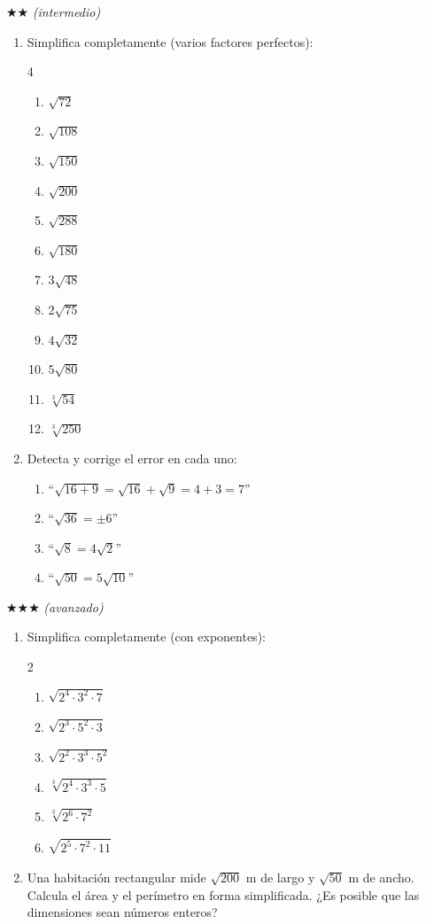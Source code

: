 \documentclass[11pt, letterpaper]{article}
\begin{document}
$\bigstar\bigstar$ \textit{(intermedio)}

\begin{enumerate}[label=\textbf{\arabic*.}, leftmargin=*, resume]
  \item Simplifica completamente (varios factores perfectos):
  \begin{multicols}{4}
  \begin{enumerate}[label=\alph*)]
    \item $\sqrt{72}$
    \item $\sqrt{108}$
    \item $\sqrt{150}$
    \item $\sqrt{200}$
    \item $\sqrt{288}$
    \item $\sqrt{180}$
    \item $3\sqrt{48}$
    \item $2\sqrt{75}$
    \item $4\sqrt{32}$
    \item $5\sqrt{80}$
    \item $\sqrt[3]{54}$
    \item $\sqrt[3]{250}$
  \end{enumerate}
  \end{multicols}

  \item Detecta y corrige el error en cada uno:
  \begin{enumerate}[label=\alph*)]
    \item ``$\sqrt{16+9}=\sqrt{16}+\sqrt{9}=4+3=7$''
    \item ``$\sqrt{36}=\pm 6$''
    \item ``$\sqrt{8}=4\sqrt{2}$''
    \item ``$\sqrt{50}=5\sqrt{10}$''
  \end{enumerate}
\end{enumerate}

$\bigstar\bigstar\bigstar$ \textit{(avanzado)}

\begin{enumerate}[label=\textbf{\arabic*.}, leftmargin=*, resume]
  \item Simplifica completamente (con exponentes):
  \begin{multicols}{2}
  \begin{enumerate}[label=\alph*)]
    \item $\sqrt{2^4\cdot 3^2\cdot 7}$
    \item $\sqrt{2^3\cdot 5^2\cdot 3}$
    \item $\sqrt{2^2\cdot 3^3\cdot 5^2}$
    \item $\sqrt[3]{2^4\cdot 3^3\cdot 5}$
    \item $\sqrt[3]{2^6\cdot 7^2}$
    \item $\sqrt{2^5\cdot 7^2\cdot 11}$
  \end{enumerate}
  \end{multicols}

  \item Una habitación rectangular mide $\sqrt{200}$ m de largo y $\sqrt{50}$ m de ancho. Calcula el área y el perímetro en forma simplificada. ¿Es posible que las dimensiones sean números enteros?
\end{enumerate}
\end{document}
